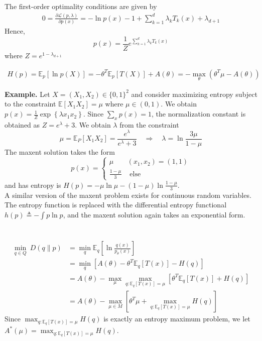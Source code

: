 \documentclass[11pt]{elegantbook}
\begin{document}
The first-order optimality conditions are given by
\begin{equation}
    \begin{aligned}
        0=\frac{\partial \mathcal{L}(p, \lambda)}{\partial p(x)}=-\ln p(x)-1+\sum_{k=1}^d\lambda_kT_k(x)+\lambda_{d+1}
    \end{aligned}
    \nonumber
\end{equation}
Hence, $$p(x)=\frac{1}{Z}e^{\sum_{k=1}^d\lambda_kT_k(x)}$$
where $Z=e^{1-\lambda_{d+1}}$

\begin{equation}
    \begin{aligned}
        H(p)=\mathbb{E}_p[\ln p(X)]=-\theta^T \mathbb{E}_p[T(X)]+A(\theta)=-\max_\theta(\theta^T \mu-A(\theta))
    \end{aligned}
    \nonumber
\end{equation}

\textbf{Example.} Let $X=\left(X_1, X_2\right) \in\{0,1\}^2$ and consider maximizing entropy subject to the constraint $\mathbb{E}\left[X_1 X_2\right]=\mu$ where $\mu \in(0,1)$. We obtain $p(x)=\frac{1}{Z} \exp \left\{\lambda x_1 x_2\right\}$. Since $\sum_x p(x)=1$, the normalization constant is obtained as $Z=e^\lambda+3$. We obtain $\lambda$ from the constraint
$$
\mu=\mathbb{E}_P\left[X_1 X_2\right]=\frac{e^\lambda}{e^\lambda+3} \quad \Rightarrow \quad \lambda=\ln \frac{3 \mu}{1-\mu}
$$
The maxent solution takes the form
$$
p(x)=\left\{\begin{matrix}
    \mu &\left(x_1, x_2\right)=(1,1) \\ \frac{1-\mu}{3} & \text { else }
\end{matrix}\right.
$$
and has entropy is $H(p)=-\mu \ln \mu-(1-\mu) \ln \frac{1-\mu}{3}$.\\
A similar version of the maxent problem exists for continuous random variables. The entropy function is replaced with the differential entropy functional $h(p) \triangleq-\int p \ln p$, and the maxent solution again takes an exponential form.


\section{}
\begin{equation}
    \begin{aligned}
        \min_{q\in Q}\ D(q\| p)&=\min_q \mathbb{E}_q\left[\ln\frac{q(x)}{p_\theta(x)}\right]\\
        &=\min_q \left[A(\theta)-\theta^T \mathbb{E}_q[T(x)]-H(q)\right]\\
        &=A(\theta)-\max_\mu \max_{q: \mathbb{E}_q[T(x)]=\mu}\left[\theta^T \mathbb{E}_q [T(x)]+H(q)\right]\\
        &=A(\theta)-\max_{\mu\in M}\left[\theta^T \mu +\max_{q: \mathbb{E}_q[T(x)]=\mu}H(q)\right]
    \end{aligned}
    \nonumber
\end{equation}
Since $\max_{q: \mathbb{E}_q[T(x)]=\mu}H(q)$ is exactly an entropy maximum problem, we let $A^*(\mu)=\max_{q: \mathbb{E}_q[T(x)]=\mu}H(q)$.
\end{document}
